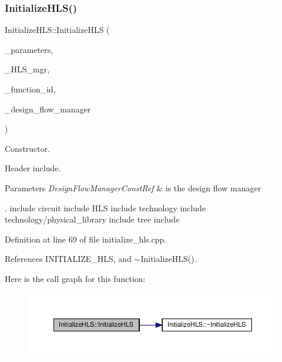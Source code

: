 \subsubsection{\texorpdfstring{Initialize\+H\+L\+S()}{InitializeHLS()}}
{\footnotesize\ttfamily Initialize\+H\+L\+S\+::\+Initialize\+H\+LS (\begin{DoxyParamCaption}\item[{const \hyperlink{Parameter_8hpp_a37841774a6fcb479b597fdf8955eb4ea}{Parameter\+Const\+Ref}}]{\+\_\+parameters,  }\item[{const \hyperlink{hls__manager_8hpp_acd3842b8589fe52c08fc0b2fcc813bfe}{H\+L\+S\+\_\+manager\+Ref}}]{\+\_\+\+H\+L\+S\+\_\+mgr,  }\item[{unsigned int}]{\+\_\+function\+\_\+id,  }\item[{const Design\+Flow\+Manager\+Const\+Ref}]{\+\_\+design\+\_\+flow\+\_\+manager }\end{DoxyParamCaption})}



Constructor. 

Header include.


\begin{DoxyParams}{Parameters}
{\em Design\+Flow\+Manager\+Const\+Ref} & is the design flow manager\\
\hline
\end{DoxyParams}
. include circuit include H\+LS include technology include technology/physical\+\_\+library include tree include 

Definition at line 69 of file initialize\+\_\+hls.\+cpp.



References I\+N\+I\+T\+I\+A\+L\+I\+Z\+E\+\_\+\+H\+LS, and $\sim$\+Initialize\+H\+L\+S().

Here is the call graph for this function\+:
\nopagebreak
\begin{figure}[H]
\begin{center}
\leavevmode
\includegraphics[width=350pt]{d1/dad/classInitializeHLS_acd3588fecbb6f0b78e6d21be966d856d_cgraph}
\end{center}
\end{figure}
\mbox{\label{classInitializeHLS_aa77f47b5204b0a974ef83ab5bec545f8}} 
